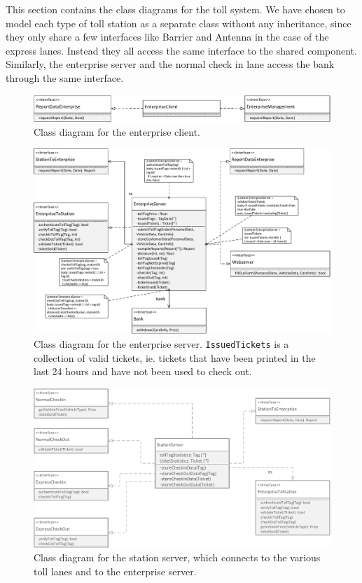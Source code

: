 This section contains the class diagrams for the toll system. We have chosen to model each type of toll station as a separate class without any inheritance, since they only share a few interfaces like Barrier and Antenna in the case of the express lanes. Instead they all access the same interface to the shared component. Similarly, the enterprise server and the normal check in lane access the bank through the same interface.

\begin{figure}[H]
\centerline{\includegraphics[width=\textwidth]{img/class_diagram/class_diagram_enterprise_client}}
\caption{Class diagram for the enterprise client.}
\label{fig:cld_ec}
\end{figure}

\begin{figure}[H]
\centerline{\includegraphics[width=\textwidth]{img/class_diagram/class_diagram_enterprise_server}}
\caption{Class diagram for the enterprise server. \texttt{IssuedTickets} is a collection of valid tickets, ie. tickets that have been printed in the last 24 hours and have not been used to check out.}
\label{fig:cld_es}
\end{figure}

\begin{figure}[H]
\centerline{\includegraphics[width=\textwidth]{img/class_diagram/class_diagram_station_server}}
\caption{Class diagram for the station server, which connects to the various toll lanes and to the enterprise server.}
\label{fig:cld_ss}
\end{figure}


